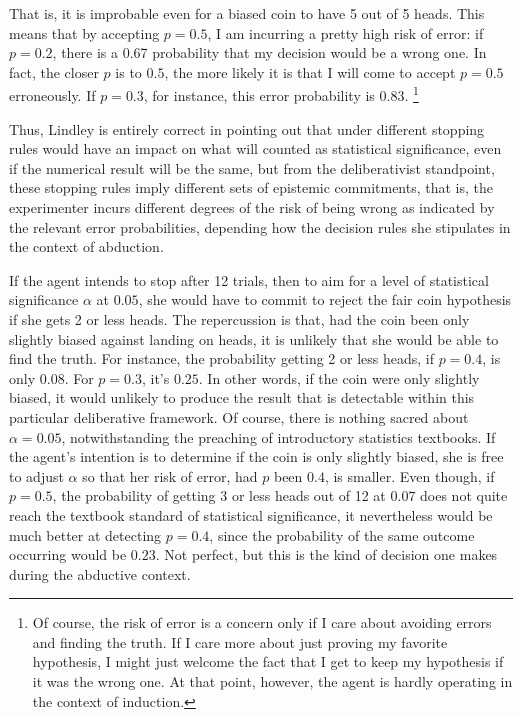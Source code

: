 That is, it is improbable even for a biased coin to have 5 out of 5 heads. This means that by accepting \(p=0.5\), I am incurring a pretty high
risk of error: if \(p=0.2\), there is a 0.67 probability that my decision would be a wrong one. In fact, the closer \(p\) is to \(0.5\), the more likely it is
that I will come to accept \(p=0.5\) erroneously. If \(p=0.3\), for
instance, this error probability is \(0.83\). \footnote{Of course, the
risk of error is a concern only if I care about avoiding errors and finding the truth. If I care more about just proving my favorite hypothesis, I might just welcome the fact that I get to keep my hypothesis if it was the wrong one. At that point, however, the agent is hardly operating in the context of induction. }


Thus, Lindley is
entirely correct in pointing out that under different stopping rules
would have an impact on what will counted as statistical significance,
even if the numerical result will be the same, but from the
deliberativist standpoint, these stopping rules imply different sets of
epistemic commitments, that is, the experimenter incurs different degrees of the risk of being wrong as indicated by the relevant error probabilities, depending how the decision rules she stipulates in the context of abduction.

If the agent intends to stop after 12 trials, then to aim for a level of
statistical significance \(\alpha\) at \(0.05\), she would have to
commit to reject the fair coin hypothesis if she gets 2 or less heads.
The repercussion is that, had the coin been only slightly biased against
landing on heads, it is unlikely that she would be able to find the
truth. For instance, the probability getting 2 or less heads, if
\(p=0.4\), is only \(0.08\). For \(p=0.3\), it's \(0.25\). In other
words, if the coin were only slightly biased, it would unlikely to
produce the result that is detectable within this particular
deliberative framework. Of course, there is nothing sacred about
\(\alpha= 0.05\), notwithstanding the preaching of introductory
statistics textbooks. If the agent's intention is to determine if the
coin is only slightly biased, she is free to adjust \(\alpha\) so that
her risk of error, had \(p\) been \(0.4\), is smaller. Even though, if
\(p=0.5\), the probability of getting 3 or less heads out of 12 at
\(0.07\) does not quite reach the textbook standard of statistical
significance, it nevertheless would be much better at detecting
\(p=0.4\), since the probability of the same outcome occurring would be
\(0.23\). Not perfect, but this is the kind of decision one makes during
the abductive context.

